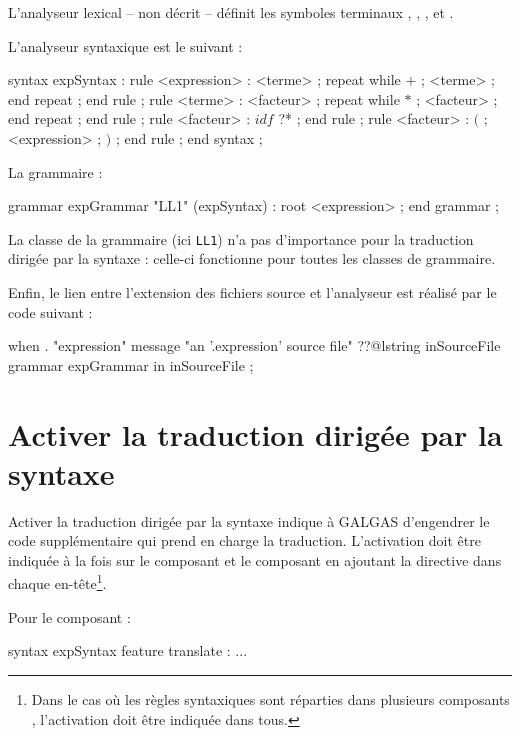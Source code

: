 L'analyseur lexical -- non décrit -- définit les symboles terminaux , \galgas{$+$}, \galgas{$*$}, \galgas{$($} et \galgas{$)$}.

L'analyseur syntaxique est le suivant :
\begin{galgascode}
syntax expSyntax :
  rule <expression> :
    <terme> ;
    repeat while $+$ ; <terme> ; end repeat ;
  end rule ;
  rule <terme> :
    <facteur> ;
    repeat while $*$ ; <facteur> ; end repeat ;
  end rule ;
  rule <facteur> :
    $idf$ ?* ;
  end rule ;
  rule <facteur> :
    $($ ;
    <expression> ;
    $)$ ;
  end rule ;
end syntax ;
\end{galgascode}

La grammaire :
\begin{galgascode}
grammar expGrammar "LL1" (expSyntax) :
  root <expression> ;
end grammar ;
\end{galgascode}

La classe de la grammaire (ici \texttt{LL1}) n'a pas d'importance pour la traduction dirigée par la syntaxe : celle-ci fonctionne pour toutes les classes de grammaire. 

Enfin, le lien entre l'extension des fichiers source et l'analyseur est réalisé par le code suivant :
\begin{galgascode}
when . "expression"
message "an '.expression' source file"
??@lstring inSourceFile {
  grammar expGrammar in inSourceFile ;
}
\end{galgascode}








\section{Activer la traduction dirigée par la syntaxe}

Activer la traduction dirigée par la syntaxe indique à GALGAS d'engendrer le code supplémentaire qui prend en charge la traduction. L'activation doit être indiquée à la fois sur le composant  et le composant  en ajoutant la directive  dans chaque en-tête\footnote{Dans le cas où les règles syntaxiques sont réparties dans plusieurs composants , l'activation doit être indiquée dans tous.}.

Pour le composant  :
\begin{galgascode}
syntax expSyntax feature translate :
  ...
\end{galgascode}

